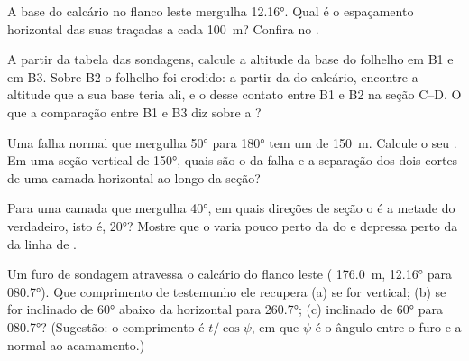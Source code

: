 \begin{exercise}[$\star\star$]\label{exo:b1:cross-sections:7}
A base do calcário no flanco leste mergulha \ang{12.16}. Qual é o espaçamento horizontal das suas  traçadas a cada \qty{100}{m}? Confira no .
\end{exercise}

\begin{exercise}[$\star\star$]\label{exo:b1:cross-sections:8}
A partir da tabela das sondagens, calcule a altitude da base do folhelho em B1 e em B3. Sobre B2 o folhelho foi erodido: a partir da  do calcário, encontre a altitude que a sua base teria ali, e o  desse contato entre B1 e B2 na seção C--D. O que a comparação entre B1 e B3 diz sobre a ?
\end{exercise}

\begin{exercise}[$\star\star$]\label{exo:b1:cross-sections:9}
Uma falha normal que mergulha \ang{50} para \ang{180} tem um  de \qty{150}{m}. Calcule o seu . Em uma seção vertical de  \ang{150}, quais são o  da falha e a separação dos dois cortes de uma camada horizontal ao longo da seção?
\end{exercise}

\begin{exercise}[$\star\star\star$]\label{exo:b1:cross-sections:10}
Para uma camada que mergulha \ang{40}, em quais direções de seção o  é a metade do  verdadeiro, isto é, \ang{20}? Mostre que o  varia pouco perto da  do  e depressa perto da  da linha de .
\end{exercise}

\begin{exercise}[$\star\star\star$]\label{exo:b1:cross-sections:11}
Um furo de sondagem atravessa o calcário do flanco leste ( \qty{176.0}{m},  \ang{12.16} para \ang{080.7}). Que comprimento de testemunho ele recupera (a) se for vertical; (b) se for inclinado de \ang{60} abaixo da horizontal para \ang{260.7}; (c) inclinado de \ang{60} para \ang{080.7}? (Sugestão: o comprimento é $t/\cos\psi$, em que $\psi$ é o ângulo entre o furo e a normal ao acamamento.)
\end{exercise}

